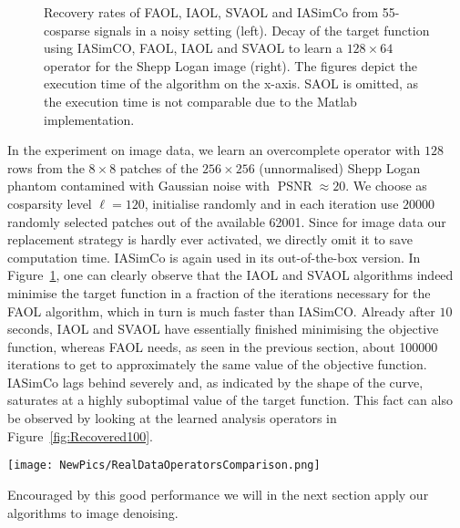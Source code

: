 \documentclass[11pt, onecolumn, journal,compsoc]{IEEEtran}
\theoremstyle{plain}
\theoremstyle{remark}
\begin{document}
\begin{figure}
\caption{Recovery rates of FAOL, IAOL, SVAOL and IASimCo from 55-cosparse signals in a noisy setting (left). Decay of the target function using IASimCO, FAOL, IAOL and SVAOL to learn a $128\times 64$ operator for the Shepp Logan image (right). The figures depict the execution time of the algorithm on the x-axis. SAOL is omitted, as the execution time is not comparable due to the Matlab implementation.}
\label{fig:ComparisonAlgorithmsRealData}
\end{figure}

%
In the experiment on image data, we learn an overcomplete operator with $128$ rows from the $8\times8$ patches of the $256\times 256$ (unnormalised) Shepp Logan phantom contamined with Gaussian noise with $\operatorname{PSNR} \approx 20$. We choose as cosparsity level $\ell=120$, initialise randomly and in each iteration use $20000$ randomly selected patches out of the available 62001. Since for image data our replacement strategy is hardly ever activated, we directly omit it to save computation time. IASimCo is again used in its out-of-the-box version.
In Figure~\ref{fig:ComparisonAlgorithmsRealData}, one can clearly observe that the IAOL and SVAOL algorithms indeed minimise the target function in a fraction of the iterations necessary for the FAOL algorithm, which in turn is much faster than IASimCO. Already after $10$ seconds, IAOL and SVAOL have essentially finished minimising the objective function, whereas FAOL needs, as seen in the previous section, about 100000 iterations to get to approximately the same value of the objective function. IASimCo lags behind severely and, as indicated by the shape of the curve, saturates at a highly suboptimal value of the target function. This fact can also be observed by looking at the learned analysis operators in Figure~\ref{fig:Recovered100}.\\
%
\begin{figure*}
	\centering 
	\texttt{[image: NewPics/RealDataOperatorsComparison.png]}
	\caption{Analysis operators learned in 120 seconds with data drawn from the Shepp-Logan phantom contaminated with Gaussian noise, by ASimco (top left), FAOL (top right), IAOL (bottom left) and SVAOL (bottom right).}
	\label{fig:Recovered100}
\end{figure*}
%
Encouraged by this good performance we will in the next section apply our algorithms to image denoising.
\end{document}
